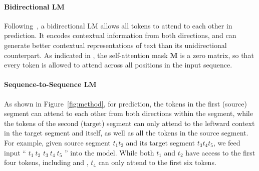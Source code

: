 \documentclass{article}
\newcommand\ours{\textsc{UniLM}}
\begin{document}



\paragraph{Bidirectional LM}
\label{sec:bi:lm}

Following~\cite{bert}, a bidirectional LM allows all tokens to attend to each other in prediction. %
It encodes contextual information from both directions, and can generate better contextual representations of text than its unidirectional counterpart.
As indicated in , the self-attention mask $\mathbf{M}$ is a zero matrix, so that every token is allowed to attend across all positions in the input sequence.


\paragraph{Sequence-to-Sequence LM}
\label{sec:s2s:lm}

As shown in Figure~\ref{fig:method}, for prediction, the tokens in the first (source) segment can attend to each other from both directions within the segment, while
the tokens of the second (target) segment can only attend to the leftward context in the target segment and itself, as well as all the tokens in the source segment.
For example, given source segment $t_1 t_2$ and its target segment $t_3 t_4 t_5$, we feed input `` $t_1~t_2$  $t_3~t_4~t_5$ '' into the model.
While both $t_1$ and $t_2$ have access to the first four tokens, including  and , $t_4$ can only attend to the first six tokens.
\end{document}
